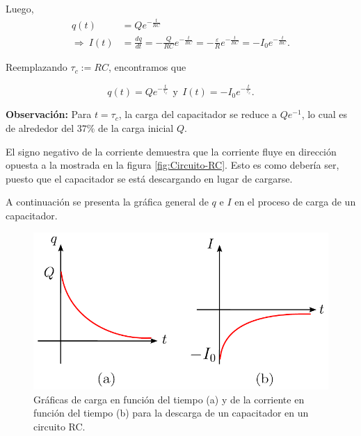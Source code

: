 \begin{itemize}
Luego,
\begin{align*}
 q(t) &= Q e^{-\frac{t}{RC}}  \\
\Rightarrow ~ I(t) &= \frac{dq}{dt} = - \frac{Q}{RC}e^{-\frac{t}{RC}} = -  \frac{\varepsilon}{R}e^{-\frac{t}{RC}} = -I_0  e^{-\frac{t}{RC}}.   
\end{align*}

Reemplazando $\tau_c := RC$, encontramos que
\begin{shaded}
  $$q(t) = Q e^{-\frac{t}{\tau_c}} ~~\mbox{y}~~ I(t) = - I_0 e^{-\frac{t}{\tau_c}}.$$  
\end{shaded}

\textbf{Observación:} Para $t = \tau_c$, la carga del capacitador se reduce a $Qe^{-1}$, lo cual es de alrededor del $37\%$ de la carga inicial $Q$. 

El signo negativo de la corriente demuestra que la corriente fluye en dirección opuesta a la mostrada en la figura \ref{fig:Circuito-RC}. Esto es como debería ser, puesto que el capacitador se está descargando en lugar de cargarse.

A continuación se presenta la gráfica general de $q$ e $I$ en el proceso de carga de un capacitador.

\begin{figure}[H]
    \centering
    \includegraphics[scale = 0.9]{Figuras/Grafica-RC-Descarga.pdf}
    \caption{Gráficas de carga en función del tiempo (a) y de la corriente en función del tiempo (b) para la descarga de un capacitador en un circuito RC.}
    \label{fig:Grafica-RC-Descarga}
\end{figure}

\end{itemize}
